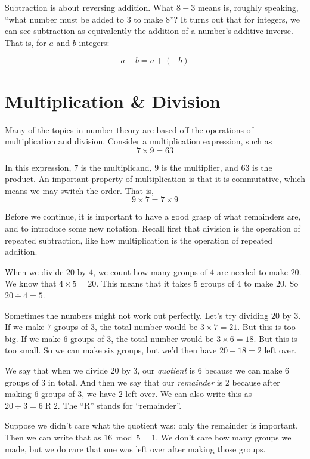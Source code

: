 \documentclass[a4paper,10pt]{report}
\begin{document}
Subtraction is about reversing addition. What \(8 - 3\) means is, roughly
speaking, ``what number must be added to \(3\) to make \(8\)''? It turns out
that for integers, we can see subtraction as equivalently the addition of a
number's additive inverse. That is, for \(a\) and \(b\) integers:

\begin{equation}
  a - b = a + (-b)
\end{equation}

\section{Multiplication \& Division}

Many of the topics in number theory are based off the operations of
multiplication and division. Consider a multiplication expression, such as \[ 7
\times 9 = 63 \]

In this expression, \(7\) is the \gls{multiplicand}, \(9\) is the
\gls{multiplier}, and \(63\) is the \gls{product}. An important property of
multiplication is that it is commutative, which means we may switch the order.
That is, \[ 9 \times 7 = 7 \times 9 \]

Before we continue, it is important to have a good grasp of what remainders
are, and to introduce some new notation. Recall first that division is the
operation of repeated subtraction, like how multiplication is the operation of
repeated addition.

When we divide \(20\) by \(4\), we count how many groups of \(4\) are needed to
make \(20\). We know that \(4 \times 5 = 20\). This means that it takes \(5\)
groups of \(4\) to make \(20\). So \(20 \div 4 = 5\).

Sometimes the numbers might not work out perfectly. Let's try dividing \(20\)
by \(3\). If we make \(7\) groups of \(3\), the total number would be \(3
\times 7 = 21\). But this is too big. If we make \(6\) groups of \(3\), the
total number would be \(3 \times 6 = 18\). But this is too small. So we can
make six groups, but we'd then have \(20 - 18 = 2\) left over.

We say that when we divide \(20\) by \(3\), our \emph{quotient} is \(6\)
because we can make \(6\) groups of \(3\) in total. And then we say that our
\emph{remainder} is \(2\) because after making \(6\) groups of \(3\), we have
\(2\) left over. We can also write this as \(20 \div 3 = 6 \operatorname{R}
2\). The ``R'' stands for ``remainder''.

Suppose we didn't care what the quotient was; only the remainder is important.
Then we can write that as \(16 \bmod 5 = 1\). We don't care how many groups we
made, but we do care that one was left over after making those groups.
\end{document}
